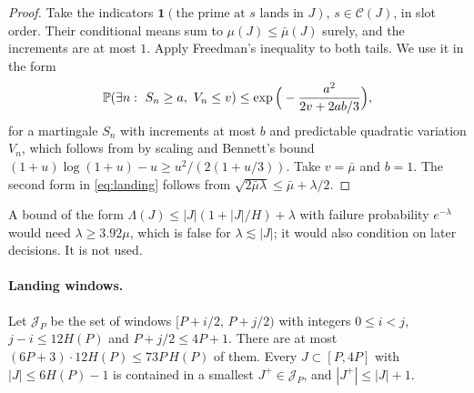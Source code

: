 \begin{proof}
Take the indicators $\mathbf 1(\text{the prime at $s$ lands in $J$})$, $s\in\mathcal C(J)$, in slot order. Their conditional
means sum to $\mu(J)\le\bar\mu(J)$ surely, and the increments are at most $1$. Apply Freedman's inequality
\cite[(4.1)]{Freedman1975} to both tails. We use it in the form
\begin{equation}\label{eq:freedman}
\mathbb{P}(\exists n:\ S_n\ge a,\ V_n\le v)\le\exp\Big(-\frac{a^2}{2v+2ab/3}\Big),
\end{equation}
for a martingale $S_n$ with increments at most $b$ and predictable quadratic variation $V_n$, which follows from \cite[(4.1)]{Freedman1975} by scaling and Bennett's bound $(1+u)\log(1+u)-u\ge u^2/(2(1+u/3))$. Take
$v=\bar\mu$ and $b=1$. The second form in \eqref{eq:landing} follows from $\sqrt{2\bar\mu\lambda}\le\bar\mu+\lambda/2$.
\end{proof}

\begin{remark}\label{rem:oldlanding}
A bound of the form $\Lambda(J)\le|J|(1+|J|/H)+\lambda$ with failure probability $e^{-\lambda}$ would need $\lambda\ge3.92\mu$,
which is false for $\lambda\lesssim|J|$; it would also condition on later decisions. It is not used.
\end{remark}

\paragraph{Landing windows.} Let $\mathcal J_P$ be the set of windows $[P+i/2,\,P+j/2)$ with integers $0\le i<j$,
$j-i\le12H(P)$ and $P+j/2\le4P+1$. There are at most $(6P+3)\cdot12H(P)\le73P\,H(P)$ of them. Every $J\subset[P,4P]$ with
$|J|\le6H(P)-1$ is contained in a smallest $J^+\in\mathcal J_P$, and $|J^+|\le|J|+1$.

